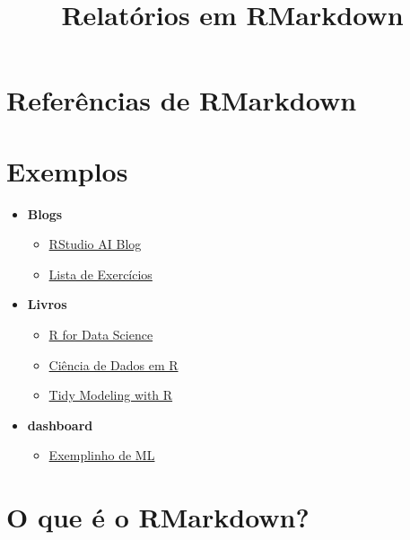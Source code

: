 \documentclass[
]{article}
\title{Relatórios em RMarkdown}
\author{}
\date{\vspace{-2.5em}}
\providecommand{\tightlist}{%
  \setlength{\itemsep}{0pt}\setlength{\parskip}{0pt}}
\begin{document}
\maketitle

\hypertarget{referuxeancias-de-rmarkdown}{%
\section{Referências de RMarkdown}\label{referuxeancias-de-rmarkdown}}

\hypertarget{exemplos}{%
\section{Exemplos}\label{exemplos}}

\begin{itemize}
\tightlist
\item
  \textbf{Blogs}

  \begin{itemize}
  \tightlist
  \item
    \href{https://blogs.rstudio.com/ai/}{RStudio AI Blog}
  \item
    \href{https://athospd.github.io/SSC5890/}{Lista de Exercícios}
  \end{itemize}
\item
  \textbf{Livros}

  \begin{itemize}
  \tightlist
  \item
    \href{https://r4ds.had.co.nz/}{R for Data Science}
  \item
    \href{https://livro.curso-r.com/}{Ciência de Dados em R}
  \item
    \href{https://www.tmwr.org/}{Tidy Modeling with R}
  \end{itemize}
\item
  \textbf{dashboard}

  \begin{itemize}
  \tightlist
  \item
    \href{https://curso-r.github.io/202104-intro-ml/exemplos/11-report-credit-data.html}{Exemplinho
    de ML}
  \end{itemize}
\end{itemize}

\hypertarget{o-que-uxe9-o-rmarkdown}{%
\section{O que é o RMarkdown?}\label{o-que-uxe9-o-rmarkdown}}
\end{document}
